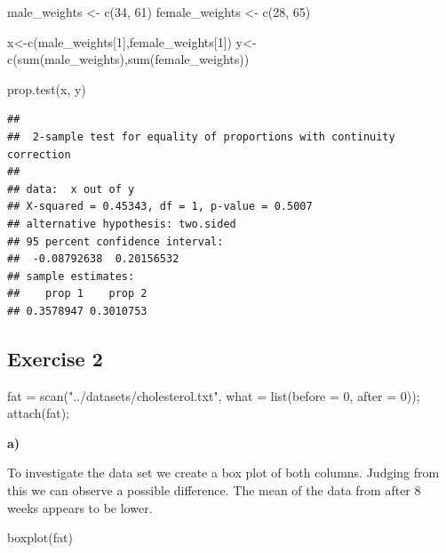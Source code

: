 \documentclass[
]{article}
\newenvironment{Shaded}{\begin{snugshade}}{\end{snugshade}}
\newcommand{\AttributeTok}[1]{\textcolor[rgb]{0.77,0.63,0.00}{#1}}
\newcommand{\DecValTok}[1]{\textcolor[rgb]{0.00,0.00,0.81}{#1}}
\newcommand{\FunctionTok}[1]{\textcolor[rgb]{0.00,0.00,0.00}{#1}}
\newcommand{\NormalTok}[1]{#1}
\newcommand{\OtherTok}[1]{\textcolor[rgb]{0.56,0.35,0.01}{#1}}
\newcommand{\StringTok}[1]{\textcolor[rgb]{0.31,0.60,0.02}{#1}}
\begin{document}
\begin{Shaded}
\begin{Highlighting}[]
\NormalTok{male\_weights }\OtherTok{\textless{}{-}} \FunctionTok{c}\NormalTok{(}\DecValTok{34}\NormalTok{, }\DecValTok{61}\NormalTok{)}
\NormalTok{female\_weights }\OtherTok{\textless{}{-}} \FunctionTok{c}\NormalTok{(}\DecValTok{28}\NormalTok{, }\DecValTok{65}\NormalTok{)}

\NormalTok{x}\OtherTok{\textless{}{-}}\FunctionTok{c}\NormalTok{(male\_weights[}\DecValTok{1}\NormalTok{],female\_weights[}\DecValTok{1}\NormalTok{])}
\NormalTok{y}\OtherTok{\textless{}{-}}\FunctionTok{c}\NormalTok{(}\FunctionTok{sum}\NormalTok{(male\_weights),}\FunctionTok{sum}\NormalTok{(female\_weights))}

\FunctionTok{prop.test}\NormalTok{(x, y)}
\end{Highlighting}
\end{Shaded}

\begin{verbatim}
## 
##  2-sample test for equality of proportions with continuity correction
## 
## data:  x out of y
## X-squared = 0.45343, df = 1, p-value = 0.5007
## alternative hypothesis: two.sided
## 95 percent confidence interval:
##  -0.08792638  0.20156532
## sample estimates:
##    prop 1    prop 2 
## 0.3578947 0.3010753
\end{verbatim}

\hypertarget{exercise-2}{%
\subsection{Exercise 2}\label{exercise-2}}

\begin{Shaded}
\begin{Highlighting}[]
\NormalTok{fat }\OtherTok{=} \FunctionTok{scan}\NormalTok{(}\StringTok{"../datasets/cholesterol.txt"}\NormalTok{, }\AttributeTok{what =} \FunctionTok{list}\NormalTok{(}\AttributeTok{before =} \DecValTok{0}\NormalTok{, }\AttributeTok{after =} \DecValTok{0}\NormalTok{));}
\FunctionTok{attach}\NormalTok{(fat);}
\end{Highlighting}
\end{Shaded}

\textbf{a)}

To investigate the data set we create a box plot of both columns.
Judging from this we can observe a possible difference. The mean of the
data from after 8 weeks appears to be lower.

\begin{Shaded}
\begin{Highlighting}[]
\FunctionTok{boxplot}\NormalTok{(fat)}
\end{Highlighting}
\end{Shaded}
\end{document}
